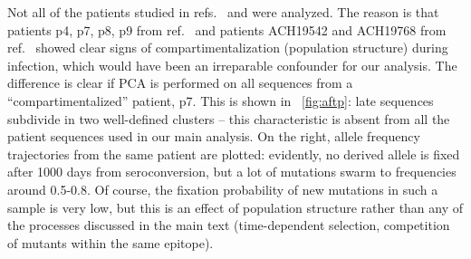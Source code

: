 \documentclass[rmp]{revtex4}
\begin{document}
Not all of the patients studied in refs.~\citealp{shankarappa_consistent_1999} and
\citealp{bunnik_autologous_2008} were analyzed. The reason is that patients p4,
p7, p8, p9 from ref.~\citealp{shankarappa_consistent_1999} and patients ACH19542
and ACH19768 from ref.~\citealp{bunnik_autologous_2008} showed clear signs of
compartimentalization (population structure) during infection, which would have
been an irreparable confounder for our analysis. The difference is clear if
PCA is performed on all sequences from a ``compartimentalized'' patient, p7.
This is shown in \figurename~\ref{fig:aftp}: late sequences subdivide in two
well-defined clusters -- this characteristic is absent from all the patient
sequences used in our main analysis. On the right, allele frequency trajectories from the same
patient are plotted: evidently, no derived allele is fixed after 1000 days
from seroconversion, but a lot of mutations swarm to frequencies around 0.5-0.8. Of
course, the fixation probability of new mutations in such a sample is very low,
but this is an effect of population structure rather than any
of the processes discussed in the main text (time-dependent selection, competition
of mutants within the same epitope).

\end{document}
